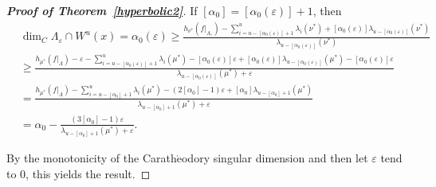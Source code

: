 \documentclass[11pt,a4paper]{amsart}
\theoremstyle{plain}
\theoremstyle{remark}
\begin{document}
\begin{proof}[\textbf{Proof of Theorem~\ref{hyperbolic2}}]
		If $[\alpha_{0}]=[\alpha_{0}(\varepsilon)]+1$,  then
		\begin{align*}
			&\dim_{C}\Lambda_{\varepsilon}\cap W^{u}(x)=\alpha_{0}(\varepsilon)\geq\frac{h_{\nu^{\ast}}(f|_{\Lambda_{\varepsilon}})-\sum^{u}_{i=u-[\alpha_{0}(\varepsilon)]+1}\lambda_{i}(\nu^{\ast})+[\alpha_{0}(\varepsilon)]\lambda_{u-[\alpha_{0}(\varepsilon)]}(\nu^{\ast})}{\lambda_{u-[\alpha_{0}(\varepsilon)]}(\nu^{\ast})}\\
			&\geq\frac{h_{\mu^{\ast}}(f|_{\Lambda})-\varepsilon-\sum^{u}_{i=u-[\alpha_{0}(\varepsilon)]+1}\lambda_{i}(\mu^{\ast})-[\alpha_{0}(\varepsilon)]\varepsilon+[\alpha_{0}(\varepsilon)]\lambda_{u-[\alpha_{0}(\varepsilon)]}(\mu^{\ast})-[\alpha_{0}(\varepsilon)]\varepsilon}{\lambda_{u-[\alpha_{0}(\varepsilon)]}(\mu^{\ast})+\varepsilon}\\
			&=\frac{h_{\mu^{\ast}}(f|_{\Lambda})-\sum^{u}_{i=u-[\alpha_{0}]+1}\lambda_{i}(\mu^{\ast})-(2[\alpha_{0}]-1)\varepsilon+[\alpha_{0}]\lambda_{u-[\alpha_{0}]+1}(\mu^{\ast})}{\lambda_{u-[\alpha_{0}]+1}(\mu^{\ast})+\varepsilon}\\ &=\alpha_{0}-\frac{(3[\alpha_{0}]-1)\varepsilon}{\lambda_{u-[\alpha_{0}]+1}(\mu^{\ast})+\varepsilon}.
		\end{align*}
		
		
		
		By the monotonicity of the Carath$\acute{\text{e}}$odory singular dimension and then let $\varepsilon$ tend to $0$, this yields the result.
	\end{proof}
	\fi
	
\end{document}
